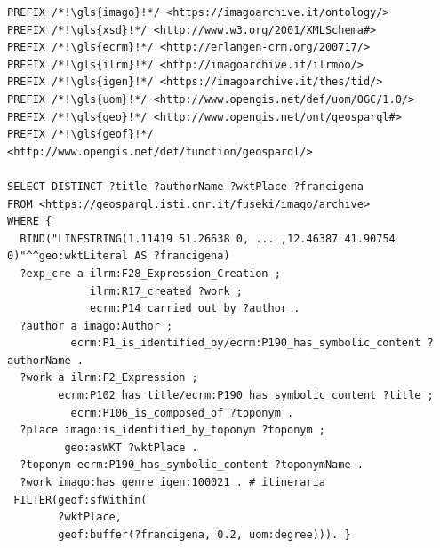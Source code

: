 \begin{lstlisting}[caption=GeoSPARQL Query 6, label={lst:query6}]
PREFIX /*!\gls{imago}!*/ <https://imagoarchive.it/ontology/>
PREFIX /*!\gls{xsd}!*/ <http://www.w3.org/2001/XMLSchema#>
PREFIX /*!\gls{ecrm}!*/ <http://erlangen-crm.org/200717/>
PREFIX /*!\gls{ilrm}!*/ <http://imagoarchive.it/ilrmoo/>
PREFIX /*!\gls{igen}!*/ <https://imagoarchive.it/thes/tid/>
PREFIX /*!\gls{uom}!*/ <http://www.opengis.net/def/uom/OGC/1.0/>
PREFIX /*!\gls{geo}!*/ <http://www.opengis.net/ont/geosparql#>
PREFIX /*!\gls{geof}!*/ <http://www.opengis.net/def/function/geosparql/> 

SELECT DISTINCT ?title ?authorName ?wktPlace ?francigena
FROM <https://geosparql.isti.cnr.it/fuseki/imago/archive>
WHERE { 
  BIND("LINESTRING(1.11419 51.26638 0, ... ,12.46387 41.90754 0)"^^geo:wktLiteral AS ?francigena)
  ?exp_cre a ilrm:F28_Expression_Creation ;
  		     ilrm:R17_created ?work ;
  		     ecrm:P14_carried_out_by ?author .	
  ?author a imago:Author ;
          ecrm:P1_is_identified_by/ecrm:P190_has_symbolic_content ?authorName .
  ?work a ilrm:F2_Expression ;
        ecrm:P102_has_title/ecrm:P190_has_symbolic_content ?title ;
  		  ecrm:P106_is_composed_of ?toponym .
  ?place imago:is_identified_by_toponym ?toponym ;
         geo:asWKT ?wktPlace .
  ?toponym ecrm:P190_has_symbolic_content ?toponymName .
  ?work imago:has_genre igen:100021 . # itineraria
 FILTER(geof:sfWithin(
        ?wktPlace,
        geof:buffer(?francigena, 0.2, uom:degree))). }
\end{lstlisting}



